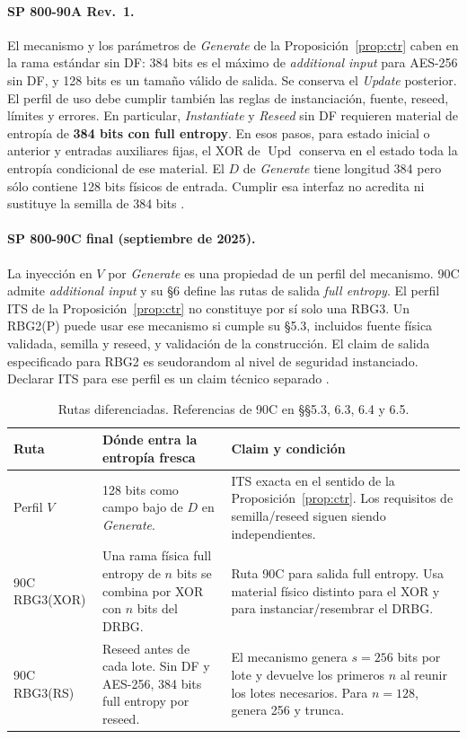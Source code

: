 \documentclass[11pt,a4paper]{article}
\begin{document}
\paragraph{SP 800-90A Rev.~1.}
El mecanismo y los parámetros de \emph{Generate} de la
Proposición~\ref{prop:ctr} caben en la rama estándar sin DF:
384 bits es el máximo de \emph{additional input} para
AES-256 sin DF, y 128 bits es un tamaño válido de salida.
Se conserva el \emph{Update} posterior.
El perfil de uso debe cumplir también las reglas de
instanciación, fuente, reseed, límites y errores. En
particular, \emph{Instantiate} y \emph{Reseed} sin DF
requieren material de entropía de \textbf{384 bits con
full entropy}. En esos pasos, para estado inicial o anterior
y entradas auxiliares fijas, el XOR de
\(\operatorname{Upd}\) conserva en el estado toda la
entropía condicional de ese material. El \(D\) de
\emph{Generate} tiene longitud 384 pero sólo contiene
128 bits físicos de entrada. Cumplir esa interfaz
no acredita ni sustituye la semilla de 384 bits
\cite[tabla 3 y §§9.1--9.3, 10.2.1.2--10.2.1.5]{nist90a}.

\paragraph{SP 800-90C final (septiembre de 2025).}
La inyección en \(V\) por \emph{Generate} es una propiedad
de un perfil del mecanismo. 90C admite \emph{additional
input} y su §6 define las rutas de salida \emph{full entropy}.
El perfil ITS de la
Proposición~\ref{prop:ctr} no constituye por sí solo una
RBG3. Un RBG2(P) puede usar ese mecanismo si cumple su §5.3,
incluidos fuente física validada, semilla y reseed, y validación
de la construcción. El claim de salida especificado para
RBG2 es seudorandom al nivel de seguridad instanciado.
Declarar ITS para ese perfil es un claim técnico separado
\cite[§§2.1--2.4, 5.2--5.3, 6.1--6.3]{nist90c}.

\begin{table}[htbp]
\centering\small
\begin{tabularx}{\linewidth}{@{}lYY@{}}
\toprule
Ruta & Dónde entra la entropía fresca & Claim y condición \\
\midrule
Perfil \(V\) &
128 bits como campo bajo de \(D\) en \emph{Generate}. &
ITS exacta en el sentido de la Proposición~\ref{prop:ctr}.
Los requisitos de semilla/reseed siguen siendo independientes. \\
90C RBG3(XOR) &
Una rama física full entropy de \(n\) bits se combina por XOR
con \(n\) bits del DRBG. &
Ruta 90C para salida full entropy. Usa material físico
distinto para el XOR y para instanciar/resembrar el DRBG. \\
90C RBG3(RS) &
Reseed antes de cada lote. Sin DF y AES-256, 384 bits
full entropy por reseed. &
El mecanismo genera \(s=256\) bits por lote y devuelve
los primeros \(n\) al reunir los lotes necesarios.
Para \(n=128\), genera 256 y trunca. \\
\bottomrule
\end{tabularx}
\caption{Rutas diferenciadas. Referencias de 90C en §§5.3, 6.3, 6.4 y 6.5.}
\end{table}
\end{document}
